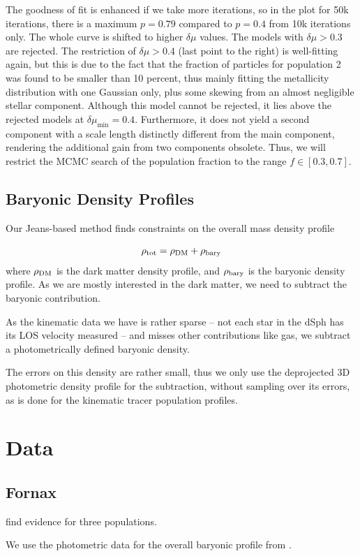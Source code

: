 The goodness of fit is enhanced if we take more iterations, so in the
plot for 50k iterations, there is a maximum $p=0.79$ compared to
$p=0.4$ from 10k iterations only. The whole curve is shifted to higher
$\delta \mu$ values. The models with $\delta \mu>0.3$ are
rejected. The restriction of $\delta \mu>0.4$ (last point to the
right) is well-fitting again, but this is due to the fact that the
fraction of particles for population 2 was found to be smaller than 10
percent, thus mainly fitting the metallicity distribution with one
Gaussian only, plus some skewing from an almost negligible stellar
component. Although this model cannot be rejected, it lies above the
rejected models at $\delta\mu_{\min}=0.4$. Furthermore, it does not
yield a second component with a scale length distinctly different from
the main component, rendering the additional gain from two components
obsolete. Thus, we will restrict the MCMC search of the population
fraction to the range $f\in[0.3,0.7]$.

\subsection{Baryonic Density Profiles}
Our Jeans-based method finds constraints on the overall mass density
profile

\begin{equation}
  \rho_{\rm tot} = \rho_{\rm DM}+\rho_{\rm bary}
\end{equation}
where $\rho_{\rm DM}$ is the dark matter density profile, and
$\rho_{\rm bary}$ is the baryonic density profile. As we are mostly
interested in the dark matter, we need to subtract the baryonic
contribution.

As the kinematic data we have is rather sparse -- not each star in the
dSph has its LOS velocity measured -- and misses other contributions
like gas, we subtract a photometrically defined baryonic density.

The errors on this density are rather small, thus we only use the
deprojected 3D photometric density profile for the subtraction,
without sampling over its errors, as is done for the kinematic tracer
population profiles.

\section{Data}

\subsection{Fornax}  find evidence for three populations.

We use the photometric data for the overall baryonic profile from \cite{DeBoer2013}.



